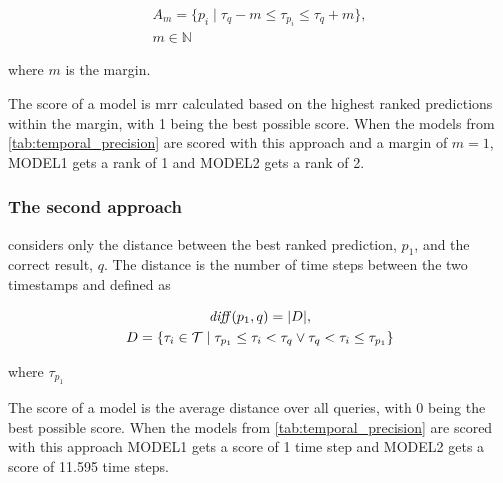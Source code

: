 \begin{equation}
\begin{gathered}
A_m = \{ p_i \mid \tau_{q} - m \le \tau_{p_i} \le \tau_{q} + m \},\\
m \in \mathbb{N}
\end{gathered}
\end{equation}

where $m$ is the margin. 

The score of a model is \gls{mrr} calculated based on the highest ranked predictions within the margin, with 1 being the best possible score.
When the models from \autoref{tab:temporal_precision} are scored with this approach and a margin of $m=1$, \textsc{MODEL1} gets a rank of 1 and \textsc{MODEL2} gets a rank of 2.

\subsubsection{The second approach}
considers only the distance between the best ranked prediction, $p_1$, and the correct result, $q$. The distance is the number of time steps between the two timestamps and defined as

\begin{equation}
\begin{gathered}
\mathit{diff}(p_1, q) = |D|,\\
D = \{ \tau_i \in \mathcal{T} \mid \tau_{p_1} \le \tau_i < \tau_q \vee \tau_q < \tau_i \le \tau_{p_1} \}
\end{gathered}
\end{equation}

\noindent
where $\tau_{p_1}$

The score of a model is the average distance over all queries, with 0 being the best possible score. When the models from \autoref{tab:temporal_precision} are scored with this approach \textsc{MODEL1} gets a score of 1 time step and \textsc{MODEL2} gets a score of 11.595 time steps.

